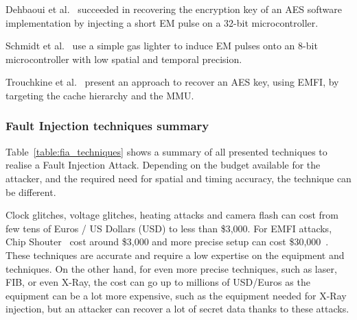 Dehbaoui et al.~\cite{DMMDT-13-cosade} succeeded in recovering the encryption key of an AES software implementation by injecting a short EM pulse on a 32-bit microcontroller.

Schmidt et al.~\cite{SH-07-austrochip} use a simple gas lighter to induce EM pulses onto an 8-bit microcontroller with low spatial and temporal precision.

Trouchkine et al.~\cite{TBELB-21-jce} present an approach to recover an AES key, using EMFI, by targeting the cache hierarchy and the MMU.

\subsubsection{Fault Injection techniques summary}
Table~\ref{table:fia_techniques} shows a summary of all presented techniques to realise a Fault Injection Attack. Depending on the budget available for the attacker, and the required need for spatial and timing accuracy, the technique can be different.

Clock glitches, voltage glitches, heating attacks and camera flash can cost from few tens of Euros / US Dollars (USD) to less than \$3,000. For EMFI attacks, Chip Shouter~\cite{chipshouter} cost around \$3,000 and more precise setup can cost \$30,000~\cite{BH-22-access}. These techniques are accurate and require a low expertise on the equipment and techniques. On the other hand, for even more precise techniques, such as laser, FIB, or even X-Ray, the cost can go up to millions of USD/Euros as the equipment can be a lot more expensive, such as the equipment needed for X-Ray injection, but an attacker can recover a lot of secret data thanks to these attacks.

